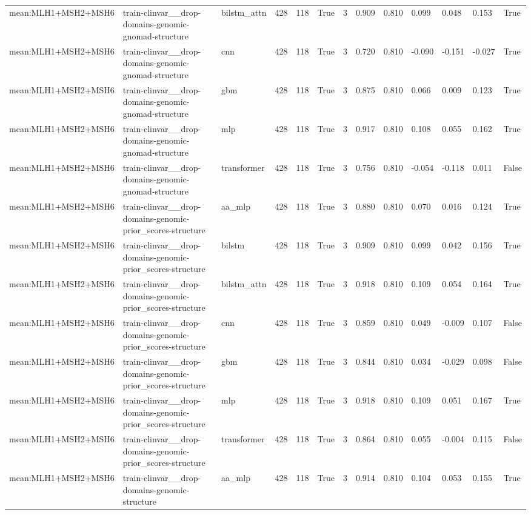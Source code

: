 \begin{table}[t]
\begin{tabular}{lllllllllllll}
mean:MLH1+MSH2+MSH6 & train-clinvar\_\_drop-domains-genomic-gnomad-structure & bilstm\_attn & 428 & 118 & True & 3 & 0.909 & 0.810 & 0.099 & 0.048 & 0.153 & True \\
mean:MLH1+MSH2+MSH6 & train-clinvar\_\_drop-domains-genomic-gnomad-structure & cnn & 428 & 118 & True & 3 & 0.720 & 0.810 & -0.090 & -0.151 & -0.027 & True \\
mean:MLH1+MSH2+MSH6 & train-clinvar\_\_drop-domains-genomic-gnomad-structure & gbm & 428 & 118 & True & 3 & 0.875 & 0.810 & 0.066 & 0.009 & 0.123 & True \\
mean:MLH1+MSH2+MSH6 & train-clinvar\_\_drop-domains-genomic-gnomad-structure & mlp & 428 & 118 & True & 3 & 0.917 & 0.810 & 0.108 & 0.055 & 0.162 & True \\
mean:MLH1+MSH2+MSH6 & train-clinvar\_\_drop-domains-genomic-gnomad-structure & transformer & 428 & 118 & True & 3 & 0.756 & 0.810 & -0.054 & -0.118 & 0.011 & False \\
mean:MLH1+MSH2+MSH6 & train-clinvar\_\_drop-domains-genomic-prior\_scores-structure & aa\_mlp & 428 & 118 & True & 3 & 0.880 & 0.810 & 0.070 & 0.016 & 0.124 & True \\
mean:MLH1+MSH2+MSH6 & train-clinvar\_\_drop-domains-genomic-prior\_scores-structure & bilstm & 428 & 118 & True & 3 & 0.909 & 0.810 & 0.099 & 0.042 & 0.156 & True \\
mean:MLH1+MSH2+MSH6 & train-clinvar\_\_drop-domains-genomic-prior\_scores-structure & bilstm\_attn & 428 & 118 & True & 3 & 0.918 & 0.810 & 0.109 & 0.054 & 0.164 & True \\
mean:MLH1+MSH2+MSH6 & train-clinvar\_\_drop-domains-genomic-prior\_scores-structure & cnn & 428 & 118 & True & 3 & 0.859 & 0.810 & 0.049 & -0.009 & 0.107 & False \\
mean:MLH1+MSH2+MSH6 & train-clinvar\_\_drop-domains-genomic-prior\_scores-structure & gbm & 428 & 118 & True & 3 & 0.844 & 0.810 & 0.034 & -0.029 & 0.098 & False \\
mean:MLH1+MSH2+MSH6 & train-clinvar\_\_drop-domains-genomic-prior\_scores-structure & mlp & 428 & 118 & True & 3 & 0.918 & 0.810 & 0.109 & 0.051 & 0.167 & True \\
mean:MLH1+MSH2+MSH6 & train-clinvar\_\_drop-domains-genomic-prior\_scores-structure & transformer & 428 & 118 & True & 3 & 0.864 & 0.810 & 0.055 & -0.004 & 0.115 & False \\
mean:MLH1+MSH2+MSH6 & train-clinvar\_\_drop-domains-genomic-structure & aa\_mlp & 428 & 118 & True & 3 & 0.914 & 0.810 & 0.104 & 0.053 & 0.155 & True \\

\end{tabular}
\end{table}
